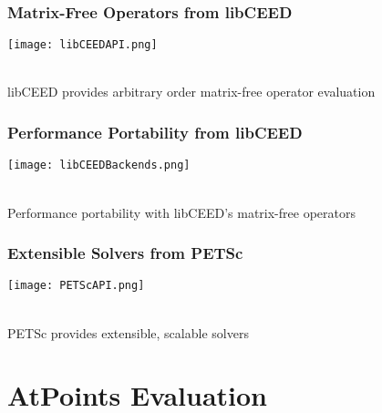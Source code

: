 \documentclass{beamer}
\begin{document}

\begin{frame}
\begin{center}
\frametitle{Matrix-Free Operators from libCEED}

\texttt{[image: libCEEDAPI.png]}

~\\

libCEED provides arbitrary order matrix-free operator evaluation\\

\end{center}
\end{frame}


\begin{frame}
\begin{center}
\frametitle{Performance Portability from libCEED}

\texttt{[image: libCEEDBackends.png]}

~\\

Performance portability with libCEED's matrix-free operators\\

\end{center}
\end{frame}


\begin{frame}
\begin{center}
\frametitle{Extensible Solvers from PETSc}

\texttt{[image: PETScAPI.png]}

~\\

PETSc provides extensible, scalable solvers\\

\end{center}
\end{frame}

\section{AtPoints Evaluation}
\end{document}
